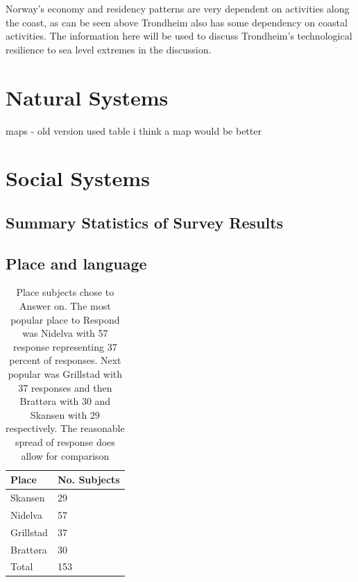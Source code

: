 Norway's economy and residency patterns are very dependent on activities along the coast\cite{aunan_strong_2008}, as can be seen above Trondheim also has some dependency on coastal activities. The information here will be used to discuss Trondheim's technological resilience to sea level extremes in the discussion. 


\section{Natural Systems}
maps - old version used table i think a map would be better



\section{Social Systems}



\subsection{Summary Statistics of Survey Results}


\subsection{Place and language}

\begin{table}[h]
    \centering
    \begin{tabular}{|l|l|}
    \hline
    Place  & No. Subjects  \\ \hline
      Skansen   & 29    \\ \hline
      Nidelva & 57      \\ \hline
      Grillstad & 37       \\ \hline
      Brattøra & 30     \\ \hline
      Total & 153   \\ \hline
     \end{tabular}
    \caption{Place subjects chose to Answer on. The most popular place to Respond was Nidelva with 57 response representing 37 percent of responses. Next popular was Grillstad with 37 responses and then Brattøra with 30 and Skansen with 29 respectively. The reasonable spread of response does allow for comparison}
    \label{tab:place}
\end{table}
